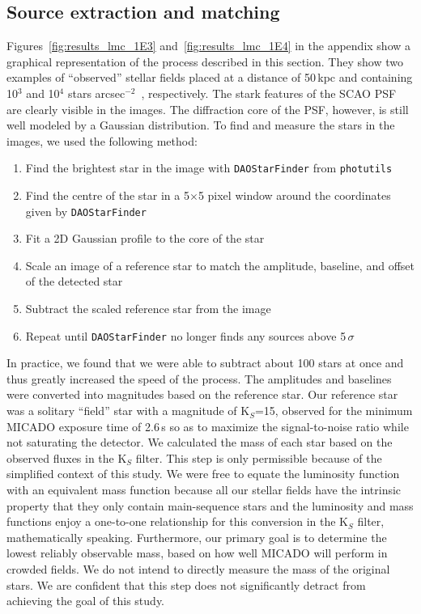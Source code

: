 \documentclass[referee]{aa}
\newcommand{\sig}{$\sigma$~}
\newcommand{\spa}{stars arcsec$^{-2}$~}
\begin{document}
\subsection{Source extraction and matching}
\label{subsec:source_extraction}

Figures~\ref{fig:results_lmc_1E3} and~\ref{fig:results_lmc_1E4} in the appendix show a graphical representation of the process described in this section.
They show two examples of ``observed'' stellar fields placed at a distance of 50\,kpc and containing 10$^3$ and 10$^4$ \spa , respectively.
The stark features of the SCAO PSF are clearly visible in the images.
The diffraction core of the PSF, however, is still well modeled by a Gaussian distribution.
To find and measure the stars in the images, we used the following method:

\begin{enumerate}
    \item Find the brightest star in the image with \verb+DAOStarFinder+ from \verb+photutils+~\citep{photutils}
    \item Find the centre of the star in a 5$\times$5 pixel window around the coordinates given by \verb+DAOStarFinder+
    \item Fit a 2D Gaussian profile to the core of the star
    \item Scale an image of a reference star to match the amplitude, baseline, and offset of the detected star
    \item Subtract the scaled reference star from the image
    \item Repeat until \verb+DAOStarFinder+ no longer finds any sources above 5\,\sig
\end{enumerate}

In practice, we found that we were able to subtract about 100 stars at once and thus greatly increased the speed of the process.
The amplitudes and baselines were converted into magnitudes based on the reference star.
Our reference star was a solitary ``field'' star with a magnitude of K$_S$=15, observed for the minimum {MICADO} exposure time of 2.6\,s so as to maximize the signal-to-noise ratio while not saturating the detector.
We calculated the mass of each star based on the observed fluxes in the K$_S$ filter.
This step is only permissible because of the simplified context of this study.
We were free to equate the luminosity function with an equivalent mass function because all our stellar fields have the intrinsic property that they only contain main-sequence stars and the luminosity and mass functions enjoy a one-to-one relationship for this conversion in the K$_S$ filter, mathematically speaking.
Furthermore, our primary goal is to determine the lowest reliably observable mass, based on how well MICADO will perform in crowded fields. We do not intend to directly measure the mass of the original stars.
We are confident that this step does not significantly detract from achieving the goal of this study.
\end{document}
